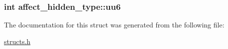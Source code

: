 \hypertarget{structaffect__hidden__type_a80680a001f067f146110fa86d4127571}{
\subsubsection[{uu6}]{\setlength{\rightskip}{0pt plus 5cm}int affect\-\_\-hidden\-\_\-type\-::uu6}}\label{structaffect__hidden__type_a80680a001f067f146110fa86d4127571}


The documentation for this struct was generated from the following file\-:\begin{DoxyCompactItemize}
\item 
\hyperlink{structs_8h}{structs.\-h}\end{DoxyCompactItemize}
